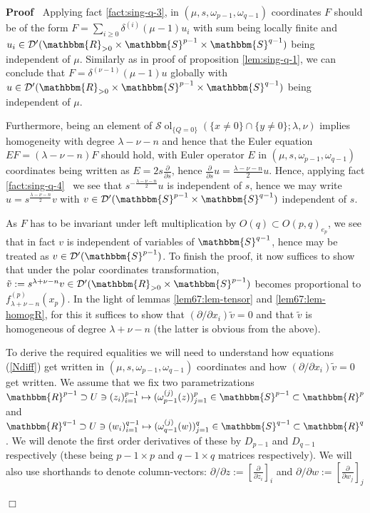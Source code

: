 \documentclass{article}
\newcommand{\assign}{:=}
\newcommand{\tmop}[1]{\ensuremath{\operatorname{#1}}}
\newenvironment{proof}{\noindent\textbf{Proof\ }}{\hspace*{\fill}$\Box$\medskip}
\numberwithin{definition}{section}
\numberwithin{lemma}{section}
\numberwithin{proposition}{section}
{\theorembodyfont{\rmfamily}\newtheorem{remark}{Remark}
\numberwithin{remark}{section}
}
\newcommand{\D}{\mathcal{D}} \newcommand{\supp}{supp}
\newcommand{\Sp}{{\mathbbm{S}}} \newcommand{\R}{{\mathbbm{R}}}
\begin{document}
\begin{proof}
  Applying fact \ref{fact:sing-q-3}, in $(\mu, s, \omega_{p - 1}, \omega_{q -
  1})$ coordinates $F$ should be of the form $F = \sum_{i \geq 0} \delta^{(i)}
  (\mu - 1) u_i$ with sum being locally finite and $u_i \in \D' ( \R_{> 0}
  \times \Sp^{p - 1} \times \mathbbm{S}^{q - 1})$ being independent of $\mu$.
  Similarly as in proof of proposition \ref{lem:sing-q-1}, we can conclude
  that $F = \delta^{(\nu - 1)}  (\mu - 1) u$ globally with $u \in \D' ( \R_{>
  0} \times \mathbbm{S}^{p - 1} \times \mathbbm{S}^{q - 1})$ being independent
  of $\mu$.
  
  Furthermore, being an element of $\mathcal{S} \tmop{ol}_{\{ Q = 0 \}} ( \{ x
  \neq 0 \} \cap \{ y \neq 0 \} ; \lambda, \nu)$ implies homogeneity with
  degree $\lambda - \nu - n$ and hence that the Euler equation $EF = (\lambda
  - \nu - n) F$ should hold, with Euler operator $E$ in $(\mu, s, \omega_{p -
  1}, \omega_{q - 1})$ coordinates being written as $E = 2 s
  \frac{\partial}{\partial s}$, hence $\frac{\partial}{\partial s} u =
  \frac{\lambda - \nu - n}{2} u$. Hence, applying fact \ref{fact:sing-q-4} \
  we see that $s^{- \frac{\lambda - \nu - n}{2}} u$ is independent of $s$,
  hence we may write $u = s^{\frac{\lambda - \nu - n}{2}} v$ with $v \in \D'
  (\mathbbm{S}^{p - 1} \times \mathbbm{S}^{q - 1})$ independent of $s$.
  
  As $F$ has to be invariant under left multiplication by $O (q) \subset O (p,
  q)_{e_p}$, we see that in fact $v$ is independent of variables of
  $\mathbbm{S}^{q - 1}$, hence may be treated as $v \in \D' (\mathbbm{S}^{p -
  1})$. To finish the proof, it now suffices to show that under the polar
  coordinates transformation, $\tilde{v} \assign s^{\lambda + \nu - n} v \in
  \D' ( \R_{> 0} \times \mathbbm{S}^{p - 1})$ becomes proportional to
  $f_{\lambda + \nu - n}^{( p)} ( x_p)$. In the light of lemmas
  \ref{lem67:lem-tensor} and \ref{lem67:lem-homogR}, for this it suffices to
  show that $(\partial / \partial x_i)  \tilde{v} = 0$ and that $\tilde{v}$ is
  homogeneous of degree $\lambda + \nu - n$ (the latter is obvious from the
  above).
  
  To derive the required equalities we will need to understand how equations
  (\ref{Ndiff}) get written in $(\mu, s, \omega_{p - 1}, \omega_{q - 1})$
  coordinates and how $(\partial / \partial x_i)  \tilde{v} = 0$ get written.
  We assume that we fix two parametrizations $\R^{p - 1} \supset U \ni (
  z_i)_{i = 1}^{p - 1} \mapsto ( \omega_{p - 1}^{(j)} (z))_{j = 1}^p \in
  \mathbbm{S}^{p - 1} \subset \R^p$ and $\R^{q - 1} \supset U \ni ( w_i)_{i =
  1}^{q - 1} \mapsto ( \omega_{q - 1}^{(j)} (w))_{j = 1}^q \in \mathbbm{S}^{q
  - 1} \subset \R^q$. We will denote the first order derivatives of these by
  $D_{p - 1}$ and $D_{q - 1}$ respectively (these being $p - 1 \times p$ and
  $q - 1 \times q$ matrices respectively). We will also use shorthands to
  denote column-vectors: $\partial / \partial z \assign \left[
  \frac{\partial}{\partial z_i} \right]_i$ and $\partial / \partial w \assign
  \left[ \frac{\partial}{\partial w_j} \right]_j$
  

\end{proof}
\end{document}
